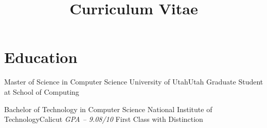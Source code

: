 \documentclass[11pt,a4paper,sans]{moderncv}
\title{Curriculum Vitae}
\begin{document}

%
%
%
%
%
%
%
%
%
\newpage


\makecvtitle %


\section{Education}

            {Master of Science in Computer Science}
            {University of Utah}{Utah}
            {\textit{}}
            {Graduate Student at School of Computing}

            {Bachelor of Technology in Computer Science}
            {National Institute of Technology}{Calicut}
            {\textit{GPA -- 9.08/10}}
            {First Class with Distinction}


%
\end{document}
